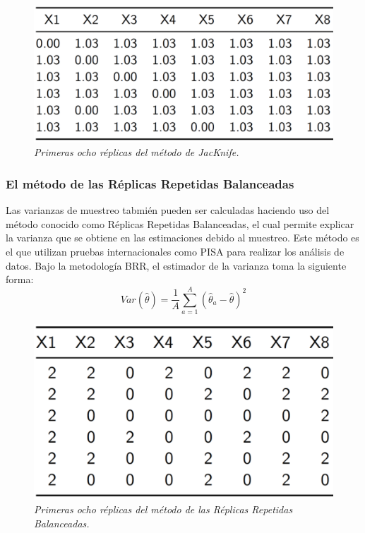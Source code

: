 \begin{figure}
\centering
\includegraphics{Pics/20.png}
\caption{\emph{Primeras ocho réplicas del método de JacKnife.}}
\end{figure}

\hypertarget{el-metodo-de-las-replicas-repetidas-balanceadas}{%
\subsubsection*{El método de las Réplicas Repetidas Balanceadas}\label{el-metodo-de-las-replicas-repetidas-balanceadas}}


Las varianzas de muestreo tabmién pueden ser calculadas haciendo uso del método conocido como Réplicas Repetidas Balanceadas, el cual permite explicar la varianza que se obtiene en las estimaciones debido al muestreo. Este método es el que utilizan pruebas internacionales como PISA para realizar los análisis de datos. Bajo la metodología BRR, el estimador de la varianza toma la siguiente forma:
\[
Var(\hat{\theta}) = \frac{1}{A}\sum_{a=1}^A(\hat{\theta}_a - \hat\theta )^2
\]

\begin{figure}
\centering
\includegraphics{Pics/21.png}
\caption{\emph{Primeras ocho réplicas del método de las Réplicas Repetidas Balanceadas.}}
\end{figure}

